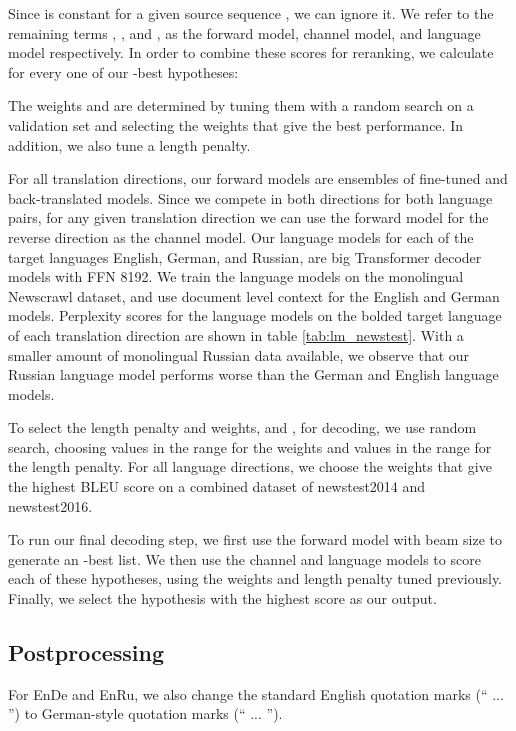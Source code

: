 \documentclass[11pt,a4paper]{article}
\newcommand{\entode}{EnDe}
\newcommand{\entoru}{EnRu}
\begin{document}
Since  is constant for a given source sequence , we can ignore it.
We refer to the remaining terms , , and , as the forward model, channel model, and language model respectively. 
In order to combine these scores for reranking, we calculate for every one of our -best hypotheses:
 
The weights  and  are determined by tuning them with a random search on a validation set and selecting the weights that give the best performance.
In addition, we also tune a length penalty.

For all translation directions, our forward models are ensembles of fine-tuned and back-translated models.
Since we compete in both directions for both language pairs, for any given translation direction we can use the forward model for the reverse direction as the channel model.
Our language models for each of the target languages English, German, and Russian, are big Transformer decoder models with FFN 8192.
We train the language models on the monolingual Newscrawl dataset, and use document level context for the English and German models. 
Perplexity scores for the language models on the bolded target language of each translation direction are shown in table \ref{tab:lm_newstest}.
With a smaller amount of monolingual Russian data available, we observe that our Russian language model performs worse than the German and English language models.

To select the length penalty and weights,  and , for decoding, we use random search, choosing values in the range  for the weights and values in the range  for the length penalty.
For all language directions, we choose the weights that give the highest BLEU score on a combined dataset of newstest2014 and newstest2016.

To run our final decoding step, we first use the forward model with beam size  to generate an -best list.
We then use the channel and language models to score each of these hypotheses, using the weights and length penalty tuned previously.
Finally, we select the hypothesis with the highest score as our output.

\subsection{Postprocessing}
For \entode{} and \entoru{}, we also change the standard English quotation marks (`` ... '') to German-style quotation marks (\enquote{ ... }).
 
\end{document}
